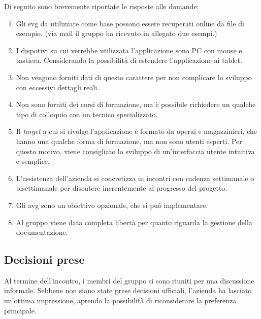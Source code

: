 Di seguito sono brevemente riportate le risposte alle domande:

\begin{enumerate}
    \item Gli svg da utilizzare come base possono essere recuperati online da 
		file di esempio. (via mail il gruppo ha ricevuto in allegato due 
		esempi.)
    \item I dispotivi su cui verrebbe utilizzata l'applicazione sono PC con 
		mouse e tastiera. 
		Considerando la possibilità di estendere l'applicazione ai tablet.
    \item Non vengono forniti dati di questo carattere per non complicare 
		lo sviluppo con eccessivi dettagli reali.
	\item Non sono forniti dei corsi di formazione, ma è possibile richiedere un
		qualche tipo di colloquio con un tecnico specializzato.
	\item Il \textit{target} a cui si rivolge l'applicazione è formato da operai 
		e magazzinieri, che hanno una qualche forma di formazione, ma non sono 
		utenti esperti. Per questo motivo, viene consigliato lo sviluppo di 
		un'interfaccia utente intuitiva e semplice.
    \item L'assistenza dell'azienda si concretizza in incontri 
		con cadenza settimanale o bisettimanale per discutere inerentemente al
		progresso del progetto.
	\item Gli avg sono un obiettivo opzionale, che si può implementare.
    \item Al gruppo viene data completa libertà per quanto riguarda la gestione 
		della documentazione. \\
\end{enumerate}

\subsection{Decisioni prese}
Al termine dell'incontro, i membri del gruppo si sono riuniti per una 
discussione informale. Sebbene non siano state prese decisioni ufficiali, 
l'azienda ha lasciato un'ottima impressione, aprendo la possibilità di 
riconsiderare la preferenza principale.
